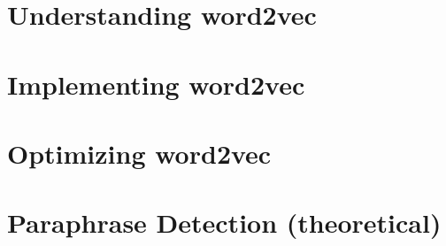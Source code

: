 \documentclass{article}
\begin{document}
\section{Understanding word2vec}
\subsection{}


\subsection{}


\subsection{}


\subsection{}


\subsection{}


\subsection{}


\section{Implementing word2vec}
\setcounter{subsection}{4}
\subsection{}

\section{Optimizing word2vec}
\subsection{}

\subsection{}


\section{Paraphrase Detection (theoretical)}
\subsection{}

\subsection{}

\newpage


\end{document}
